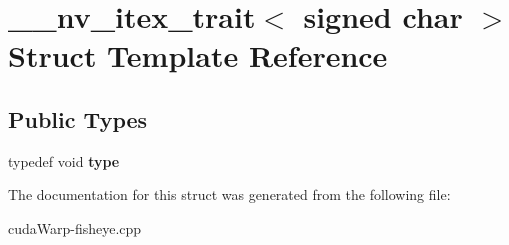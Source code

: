 \hypertarget{struct____nv__itex__trait_3_01signed_01char_01_4}{}\section{\+\_\+\+\_\+nv\+\_\+itex\+\_\+trait$<$ signed char $>$ Struct Template Reference}
\label{struct____nv__itex__trait_3_01signed_01char_01_4}
\subsection*{Public Types}
\begin{DoxyCompactItemize}
\item 
typedef void {\bfseries type}\hypertarget{struct____nv__itex__trait_3_01signed_01char_01_4_aa3802c3983566aacd1f15cef37562e5b}{}\label{struct____nv__itex__trait_3_01signed_01char_01_4_aa3802c3983566aacd1f15cef37562e5b}

\end{DoxyCompactItemize}


The documentation for this struct was generated from the following file\+:\begin{DoxyCompactItemize}
\item 
cuda\+Warp-\/fisheye.\+cpp\end{DoxyCompactItemize}
